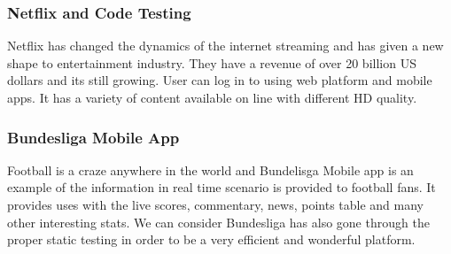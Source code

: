 \subsubsection{Netflix and Code Testing}
Netflix has changed the dynamics of the internet streaming and has given a new shape to entertainment industry. They have a revenue of over 20 billion US dollars and its still growing. User can log in to using web platform and mobile apps. It has a variety of content available on line with different HD quality. ~\cite{netflix}

\subsubsection{Bundesliga Mobile App}
Football  is a craze anywhere in the world and Bundelisga Mobile app is an example of the information in real time scenario is provided to football fans. It provides uses with the live scores, commentary, news, points table and many other interesting stats. We can consider Bundesliga has also gone through the proper static testing in order to be a very efficient and wonderful platform. ~\cite{bundesliga}
